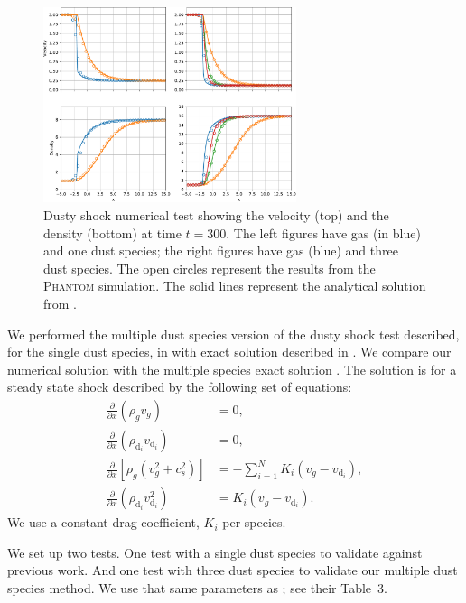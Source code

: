 \documentclass[fleqn,usenatbib]{mnras}
\newcommand{\dd}{\mathrm{d}}
\begin{document}
\begin{figure}
   \begin{center}
      \includegraphics[width=0.66\textwidth]{figs/dustyshock_velocity_density.pdf}
      \caption{Dusty shock numerical test showing the velocity (top) and the
         density (bottom) at time \(t=300\). The left figures have gas (in blue)
         and one dust species; the right figures have gas (blue) and three dust
         species. The open circles represent the results from the
         \textsc{Phantom} simulation. The solid lines represent the analytical
         solution from
         \citet{Benitez-Llambay2019ApJS..241...25B}.\label{fig:dustyshock_final}}
   \end{center}
\end{figure}

We performed the multiple dust species version of the dusty shock test
described, for the single dust species, in \citet{Laibe2012MNRAS.420.2345L} with
exact solution described in \citet{Lehmann2018MNRAS.476.3185L}. We compare our
numerical solution with the multiple species exact solution
\citep{Benitez-Llambay2019ApJS..241...25B}. The solution is for a steady state
shock described by the following set of equations:
%
\begin{align}
   \frac{\partial}{\partial x} \left( \rho_g v_g \right) &= 0, \\
   \frac{\partial}{\partial x} \left( \rho_{\dd_i} v_{\dd_i} \right) &= 0, \\
   \frac{\partial}{\partial x} \left[ \rho_g (v_g^2 + c_s^2)\right] &= - \sum_{i=1}^N K_i (v_g - v_{\dd_i}), \\
   \frac{\partial}{\partial x} \left( \rho_{\dd_i} v_{\dd_i}^2 \right) &= K_i (v_g - v_{\dd_i}).
\end{align}
%
We use a constant drag coefficient, \(K_i\) per species.

We set up two tests. One test with a single dust species to validate against
previous work. And one test with three dust species to validate our multiple
dust species method. We use that same parameters as
\citet{Benitez-Llambay2019ApJS..241...25B}; see their Table~3.
\end{document}
